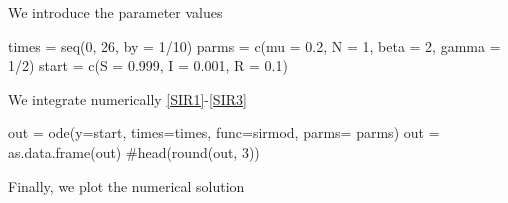 \documentclass[12pt]{article}\usepackage[]{graphicx}\usepackage[]{color}
\begin{document}
We introduce the parameter values

\begin{Schunk}
\begin{Sinput}
times = seq(0, 26, by = 1/10)
parms = c(mu = 0.2, N = 1, beta = 2, gamma = 1/2)
start = c(S = 0.999, I = 0.001, R = 0.1)
\end{Sinput}
\end{Schunk}


We integrate numerically \eqref{SIR1}-\eqref{SIR3}

\begin{Schunk}
\begin{Sinput}
out = ode(y=start, times=times, func=sirmod, parms= parms)
out = as.data.frame(out) 
#head(round(out, 3))
\end{Sinput}
\end{Schunk}

Finally, we plot the numerical solution
\end{document}
